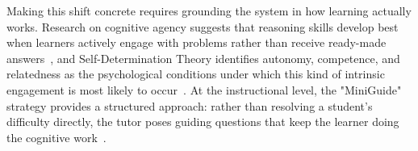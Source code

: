 Making this shift concrete requires grounding the system in how learning actually works. Research on cognitive agency suggests that reasoning skills develop best when learners actively engage with problems rather than receive ready-made answers~\cite{nirenburg2017cognitive, ricci2022go}, and Self-Determination Theory identifies autonomy, competence, and relatedness as the psychological conditions under which this kind of intrinsic engagement is most likely to occur~\cite{ryan2000self}. At the instructional level, the "MiniGuide" strategy provides a structured approach: rather than resolving a student's difficulty directly, the tutor poses guiding questions that keep the learner doing the cognitive work~\cite{lithner2025miniguide}.